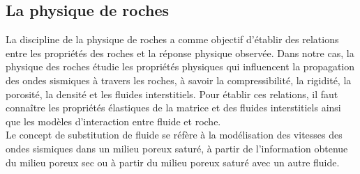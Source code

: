 \subsection{La physique de roches}
La discipline de la physique de roches a comme objectif d'établir des relations entre les propriétés des roches et la réponse physique observée. Dans notre cas, la physique des roches étudie les propriétés physiques qui influencent la propagation des ondes sismiques à travers les roches, à savoir la compressibilité, la rigidité, la porosité, la densité et les fluides interstitiels. Pour établir ces relations, il faut connaître les propriétés élastiques de la matrice et des fluides interstitiels ainsi que les modèles d'interaction entre fluide et roche. \\
Le concept de substitution de fluide se réfère à la modélisation des vitesses des ondes sismiques dans un milieu poreux saturé, à partir de l'information obtenue du milieu poreux sec ou à partir du milieu poreux saturé avec un autre fluide.

